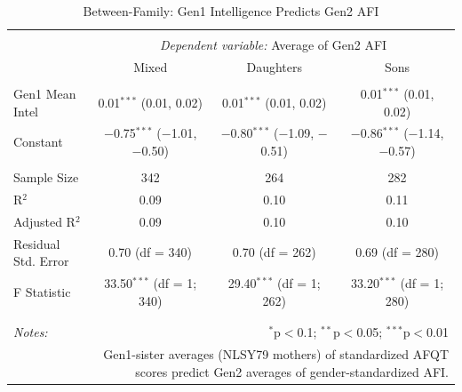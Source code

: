 \documentclass[a4paper,man,apacite,natbib,12pt,longtable]{apa6}\usepackage[]{graphicx}\usepackage[]{color}
\begin{document}
\begin{landscape}
\begin{longtable}{@{\extracolsep{5pt}}lccc} 
\caption{Between-Family: Gen1 Intelligence Predicts Gen2 AFI}\label{table_Mean_Mom_Intelligence_Mean_Child_AFI_9}
\\[-1.8ex]\hline 
\hline \\[-3.8ex] 
& \multicolumn{3}{c}{\textit{Dependent variable:} Average of Gen2 AFI} \\ 
\cline{2-4}
 & Mixed & Daughters & Sons \\ 
\hline \\[-1.8ex] 
 Gen1 Mean Intel & 0.01$^{***}$ (0.01, 0.02) & 0.01$^{***}$ (0.01, 0.02) & 0.01$^{***}$ (0.01, 0.02) \\ 
  Constant & $-$0.75$^{***}$ ($-$1.01, $-$0.50) & $-$0.80$^{***}$ ($-$1.09, $-$0.51) & $-$0.86$^{***}$ ($-$1.14, $-$0.57) \\ 
 \hline \\[-1.8ex] 
Sample Size & 342 & 264 & 282 \\ 
R$^{2}$ & 0.09 & 0.10 & 0.11 \\ 
Adjusted R$^{2}$ & 0.09 & 0.10 & 0.10 \\ 
Residual Std. Error & 0.70 (df = 340) & 0.70 (df = 262) & 0.69 (df = 280) \\ 
F Statistic & 33.50$^{***}$ (df = 1; 340) & 29.40$^{***}$ (df = 1; 262) & 33.20$^{***}$ (df = 1; 280) \\ 
\hline 
\hline \\[-1.8ex] \\[-7ex]
\textit{Notes:}  & \multicolumn{3}{r}{$^{*}$p$<$0.1; $^{**}$p$<$0.05; $^{***}$p$<$0.01} \\[2ex]
& \multicolumn{3}{r}{\parbox{.6\linewidth}{\footnotesize Gen1-sister averages (NLSY79 mothers) of standardized AFQT scores predict Gen2 averages of gender-standardized AFI.}} \\ 
\end{longtable}\pagebreak


\end{landscape}
\end{document}

